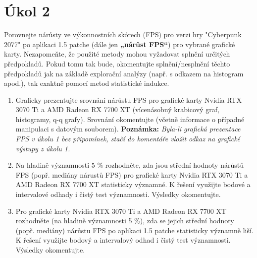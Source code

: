\section*{Úkol 2}
\label{sec:task-2}

Porovnejte nárůsty ve výkonnostních skórech (FPS) pro verzi hry "Cyberpunk 2077" po aplikaci 1.5 patche (dále jen \textbf{„nárůst FPS“}) pro vybrané grafické karty. Nezapomeňte, že použité metody mohou vyžadovat splnění určitých předpokladů. Pokud tomu tak bude, okomentujte splnění/nesplnění těchto předpokladů jak na základě explorační analýzy (např. s odkazem na histogram apod.), tak exaktně pomocí metod statistické indukce.

\begin{enumerate}[label=\alph*)]
    \item Graficky prezentujte srovnání nárůstu FPS pro grafické karty Nvidia RTX 3070 Ti a AMD Radeon RX 7700 XT (vícenásobný krabicový graf, histogramy, q-q grafy). Srovnání okomentujte (včetně informace o případné manipulaci s datovým souborem). 
    \textbf{Poznámka:} \textit{Byla-li grafická prezentace FPS v úkolu 1 bez připomínek, stačí do komentáře vložit odkaz na grafické výstupy z úkolu 1.}

    \newpage
    \item Na hladině významnosti 5 \% rozhodněte, zda jsou střední hodnoty nárůstů FPS (popř. mediány nárustů FPS) pro grafické karty Nvidia RTX 3070 Ti a AMD Radeon RX 7700 XT statisticky významné. K řešení využijte bodové a intervalové odhady i čistý test významnosti. Výsledky okomentujte.

    \newpage
    \item Pro grafické karty Nvidia RTX 3070 Ti a AMD Radeon RX 7700 XT rozhodněte (na hladině významnosti 5 \%), zda se jejich střední hodnoty (popř. mediány) nárůstu FPS po aplikaci 1.5 patche statisticky významně liší. K řešení využijte bodový a intervalový odhad i čistý test významnosti. Výsledky okomentujte.
\end{enumerate}

\endinput